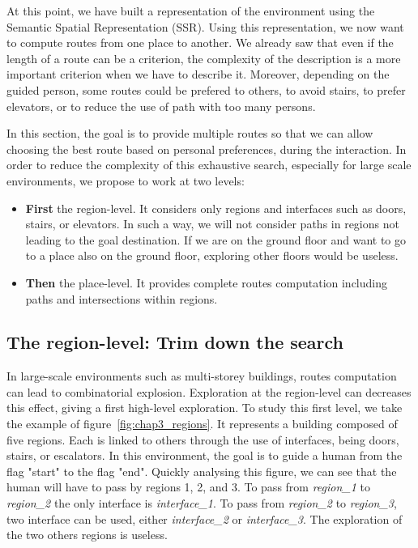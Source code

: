 At this point, we have built a representation of the environment using the Semantic Spatial Representation (SSR). Using this representation, we now want to compute routes from one place to another. We already saw that even if the length of a route can be a criterion, the complexity of the description is a more important criterion when we have to describe it. Moreover, depending on the guided person, some routes could be prefered to others, to avoid stairs, to prefer elevators, or to reduce the use of path with too many persons.

In this section, the goal is to provide multiple routes so that we can allow choosing the best route based on personal preferences, during the interaction. In order to reduce the complexity of this exhaustive search, especially for large scale environments, we propose to work at two levels:
\begin{itemize}
\item \textbf{First} the region-level. It considers only regions and interfaces such as doors, stairs, or elevators. In such a way, we will not consider paths in regions not leading to the goal destination. If we are on the ground floor and want to go to a place also on the ground floor, exploring other floors would be useless.
\item \textbf{Then} the place-level. It provides complete routes computation including paths and intersections within regions.
\end{itemize}

\subsection{The region-level: Trim down the search}

In large-scale environments such as multi-storey buildings, routes computation can lead to combinatorial explosion. Exploration at the region-level can decreases this effect, giving a first high-level exploration. To study this first level, we take the example of figure~\ref{fig:chap3_regions}. It represents a building composed of five regions. Each is linked to others through the use of interfaces, being doors, stairs, or escalators. In this environment, the goal is to guide a human from the flag "start" to the flag "end". Quickly analysing this figure, we can see that the human will have to pass by regions 1, 2, and 3. To pass from \textit{region\_1} to \textit{region\_2} the only interface is \textit{interface\_1}. To pass from \textit{region\_2} to \textit{region\_3}, two interface can be used, either \textit{interface\_2} or \textit{interface\_3}. The exploration of the two others regions is useless.

